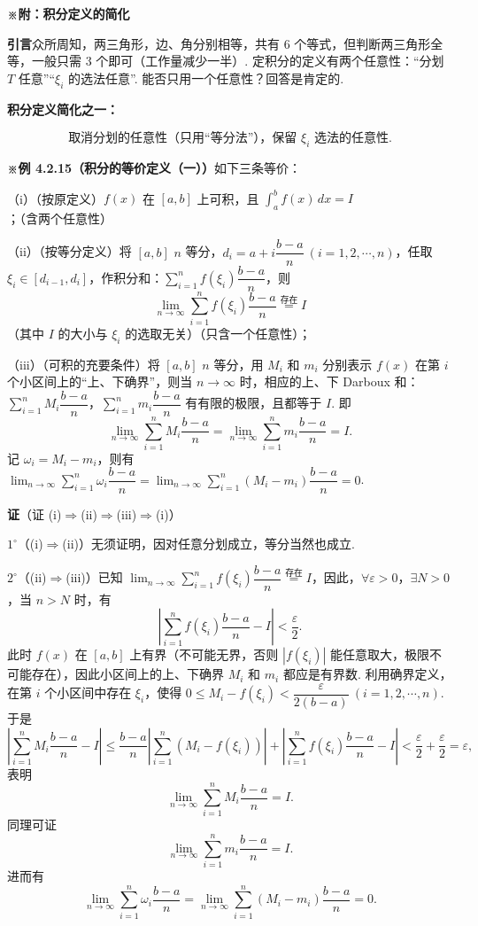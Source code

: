 \documentclass[UTF8,12pt,a4paper,fontset=fandol]{ctexart}
\begin{document}
\noindent\textbf{※附：积分定义的简化}

\noindent\textbf{引言}\quad 众所周知，两三角形，边、角分别相等，共有 6 个等式，但判断两三角形全等，一般只需 3 个即可（工作量减少一半）. 定积分的定义有两个任意性：“分划 $T$ 任意”“$\xi_i$ 的选法任意”. 能否只用一个任意性？回答是肯定的.

\noindent\textbf{积分定义简化之一：}

\[
\text{取消分划的任意性（只用“等分法”），保留 $\xi_i$ 选法的任意性.}
\]

\noindent\textbf{※例 4.2.15（积分的等价定义（一））}\quad 如下三条等价：

（i）（按原定义）$f(x)$ 在 $[a,b]$ 上可积，且 $\int_a^b f(x)\,dx=I$；（含两个任意性）

（ii）（按等分定义）将 $[a,b]$ $n$ 等分，$d_i=a+i\dfrac{b-a}{n}\ (i=1,2,\cdots,n)$，任取 $\xi_i\in[d_{i-1},d_i]$，作积分和：$\sum_{i=1}^n f(\xi_i)\dfrac{b-a}{n}$，则
\[
\lim_{n\to\infty}\sum_{i=1}^n f(\xi_i)\frac{b-a}{n}\stackrel{\text{存在}}{=}I
\]
（其中 $I$ 的大小与 $\xi_i$ 的选取无关）（只含一个任意性）；

（iii）（可积的充要条件）将 $[a,b]$ $n$ 等分，用 $M_i$ 和 $m_i$ 分别表示 $f(x)$ 在第 $i$ 个小区间上的“上、下确界”，则当 $n\to\infty$ 时，相应的上、下 Darboux 和：$\sum_{i=1}^n M_i\dfrac{b-a}{n}$，$\sum_{i=1}^n m_i\dfrac{b-a}{n}$ 有有限的极限，且都等于 $I$. 即
\[
\lim_{n\to\infty}\sum_{i=1}^nM_i\frac{b-a}{n}
=\lim_{n\to\infty}\sum_{i=1}^n m_i\frac{b-a}{n}=I.
\]
记 $\omega_i=M_i-m_i$，则有 $\lim_{n\to\infty}\sum_{i=1}^n\omega_i\dfrac{b-a}{n}=\lim_{n\to\infty}\sum_{i=1}^n(M_i-m_i)\dfrac{b-a}{n}=0$.

\noindent\textbf{证}\quad （证 (i)$\Rightarrow$(ii)$\Rightarrow$(iii)$\Rightarrow$(i)）

$1^\circ$（(i)$\Rightarrow$(ii)）无须证明，因对任意分划成立，等分当然也成立.

$2^\circ$（(ii)$\Rightarrow$(iii)）已知 $\lim_{n\to\infty}\sum_{i=1}^n f(\xi_i)\dfrac{b-a}{n}\stackrel{\text{存在}}{=}I$，因此，$\forall\varepsilon>0$，$\exists N>0$，当 $n>N$ 时，有
\[
\left|\sum_{i=1}^n f(\xi_i)\frac{b-a}{n}-I\right|<\frac{\varepsilon}{2}.
\]
此时 $f(x)$ 在 $[a,b]$ 上有界（不可能无界，否则 $|f(\xi_i)|$ 能任意取大，极限不可能存在），因此小区间上的上、下确界 $M_i$ 和 $m_i$ 都应是有界数. 利用确界定义，在第 $i$ 个小区间中存在 $\xi_i$，使得 $0\le M_i-f(\xi_i)<\dfrac{\varepsilon}{2(b-a)}\ (i=1,2,\cdots,n)$. 于是
\[
\left|\sum_{i=1}^n M_i\frac{b-a}{n}-I\right|
\le \frac{b-a}{n}\left|\sum_{i=1}^n(M_i-f(\xi_i))\right|
+\left|\sum_{i=1}^n f(\xi_i)\frac{b-a}{n}-I\right|
<\frac{\varepsilon}{2}+\frac{\varepsilon}{2}=\varepsilon,
\]
表明
\[
\lim_{n\to\infty}\sum_{i=1}^n M_i\frac{b-a}{n}=I.
\]
同理可证
\[
\lim_{n\to\infty}\sum_{i=1}^n m_i\frac{b-a}{n}=I.
\]
进而有
\[
\lim_{n\to\infty}\sum_{i=1}^n\omega_i\frac{b-a}{n}
=\lim_{n\to\infty}\sum_{i=1}^n(M_i-m_i)\frac{b-a}{n}=0.
\]
\end{document}
